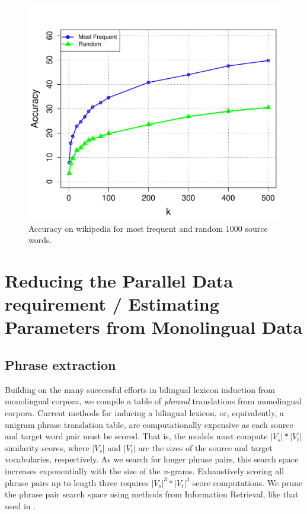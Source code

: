 \documentclass[11pt]{article}
\begin{document}
\begin{figure}[t]
\vskip 0.1in
\begin{center}
\centerline{\includegraphics[scale=0.45]{../figures/lexinduct/lexinduct.pdf}} %
\caption{Accuracy on wikipedia for most frequent and random 1000 source words. }
\label{fig:lexinduct}
\end{center}
\end{figure}
 

\section{Reducing the Parallel Data requirement / Estimating Parameters from Monolingual Data} \label{sect:mono}

\subsection{Phrase extraction}  \label{sect:extract}

Building on the many successful efforts in bilingual lexicon induction from monolingual corpora, we compile a table of {\it phrasal} translations from monolingual corpora. Current methods for inducing a bilingual lexicon, or, equivalently, a unigram phrase translation table, are computationally expensive as each source and target word pair must be scored. That is, the models must  compute $|V_s| * |V_t|$ similarity scores, where $|V_s|$ and $|V_t|$ are the sizes of the source and target vocabularies, respectively. As we search for longer phrase pairs, this search space increases exponentially with the size of the  {\it n}-grams. Exhaustively scoring all phrase pairs up to length three requires $|V_s|^3 * |V_t|^3 $ score computations. We prune the phrase pair search space using methods from Information Retrieval, like that used in . 
\end{document}
